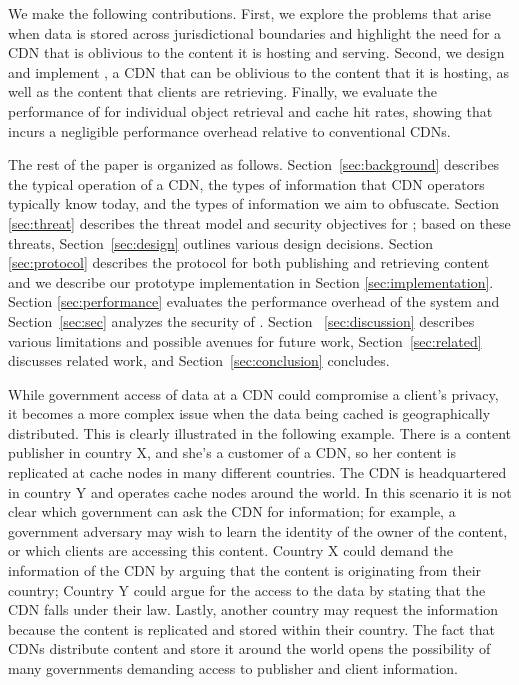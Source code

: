 We make the following contributions. First, we explore the problems that
arise when data is stored across jurisdictional boundaries and highlight the
need for a CDN that is oblivious to the content it is hosting and serving.
Second, we design and implement \system{}, a CDN that can be oblivious to the
content that it is hosting, as well as the content that clients are
retrieving. Finally, we evaluate the performance of \system{} for individual
object retrieval and cache hit rates, showing that \system{} incurs a negligible performance
overhead relative to conventional CDNs.

The rest of the paper is organized as follows. Section~\ref{sec:background} describes
the typical operation of a CDN, the types of information that CDN operators
typically know today, and the types of information we aim to obfuscate.  Section~
\ref{sec:threat} describes the threat model and security objectives for \system{}; based
on these threats, Section~\ref{sec:design} outlines various design decisions. Section~
\ref{sec:protocol} describes the protocol for both publishing and retrieving content and we describe 
our prototype implementation in Section \ref{sec:implementation}.
Section \ref{sec:performance} evaluates the performance overhead of the system and Section~\ref{sec:sec} 
analyzes the security of \system{}. Section~
\ref{sec:discussion} describes various limitations and possible avenues for future
work, Section~\ref{sec:related} discusses related work, and Section~\ref{sec:conclusion}
concludes.


While government access of data at a CDN could compromise a client's privacy,
it becomes a more complex issue when the data being cached is geographically
distributed. This is clearly illustrated in the following example.  There is a
content publisher in  country X, and she's a customer of a CDN, so her content
is replicated at cache nodes in many  different countries.  The CDN is
headquartered  in country Y and operates cache nodes around the world.  In
this scenario it is not clear which government can ask the CDN for
information; for  example, a government adversary may wish to learn the
identity of the owner of the content, or which clients are accessing  this
content.  Country X could demand the information of the CDN by arguing that
the content is originating  from their country; Country Y could argue for the
access to the data by stating that the CDN falls under their  law.  Lastly,
another country may request the information because the content is replicated
and stored within  their country.  The fact that CDNs distribute content and
store it around the world opens the possibility of  many governments demanding
access to publisher and client information.

